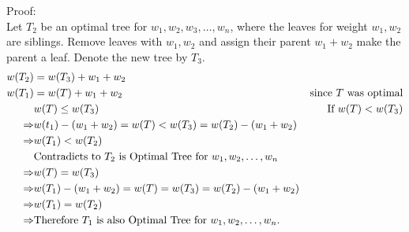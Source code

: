 \documentclass[a4paper]{article}
\begin{document}
Proof:\\
Let $T_2$ be an optimal tree for $w_1, w_2, w_3, \ldots , w_n$, where the leaves for weight $w_1, w_2$ are siblings. Remove leaves with $w_1, w_2$ and assign their parent $w_1+w_2$ make the parent a leaf. Denote the new tree by $T_3$.
\begin{align*}
    w(T_2) &= w(T_3)+w_1+w_2\\
    w(T_1) &= w(T)+w_1+w_2&\hfill \text{since $T$ was optimal} \\
    &w(T)\leq w(T_3)&\hfill \text{If $w(T) < w(T_3)$}\\
    \Rightarrow &w(t_1)-(w_1+w_2)=w(T)<w(T_3)=w(T_2)-(w_1+w_2)\\
    \Rightarrow &w(T_1) < w(T_2)\\
    &\text{Contradicts to $T_2$ is Optimal Tree for $w_1,w_2,\ldots,w_n$}\\
    \Rightarrow &w(T)=w(T_3)\\
    \Rightarrow & w(T_1)-(w_1+w_2) = w(T)=w(T_3)=w(T_2)-(w_1+w_2)\\
    \Rightarrow&w(T_1)=w(T_2)\\
    \Rightarrow&\text{Therefore $T_1$ is also Optimal Tree for $w_1,w_2,\ldots, w_n$.}
\end{align*}
\end{document}
